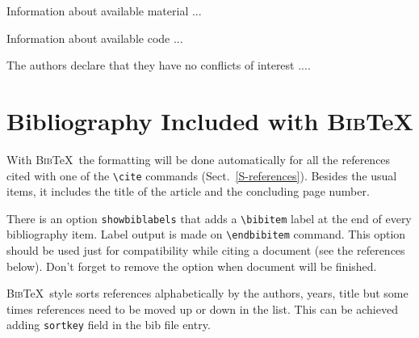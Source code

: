 \documentclass[namedreferences,hyperref,optionalrh]{spr-sola}
\newcommand{\BibTeX}{\textsc{Bib}\TeX}
\begin{document}
\begin{materialsavailability}
Information about available material ...
\end{materialsavailability}

\begin{codeavailability}
Information about available code ...
\end{codeavailability}

\begin{ethics}
\begin{conflict}
The authors declare that they have no conflicts of interest ....
\end{conflict}
\end{ethics}
  
  
\section*{Bibliography Included with \BibTeX } 
  With \BibTeX\ the formatting will be done automatically for all 
the references cited with one
of the \verb+\cite+ commands (Sect.~\ref{S-references}).
Besides the usual items, it includes the title of the article 
and the concluding page number. 
   
There is an option \texttt{showbiblabels} that adds a \verb+\bibitem+ 
label at the end of every bibliography item. Label output is made on \verb+\endbibitem+ command.
This option should be used 
just for compatibility while citing a document (see the references below). 
Don't forget to remove the option when document will be finished.

\BibTeX\ style sorts references alphabetically by the authors, years, title but some times references
need to be moved up or down in the list. This can be achieved adding \verb+sortkey+ field in the bib file entry.


  

 {\typeout{}
\typeout{****************************************************}
\typeout{****************************************************}
  
\typeout{****************************************************}
\typeout{****************************************************}
\typeout{}}
\end{document}
